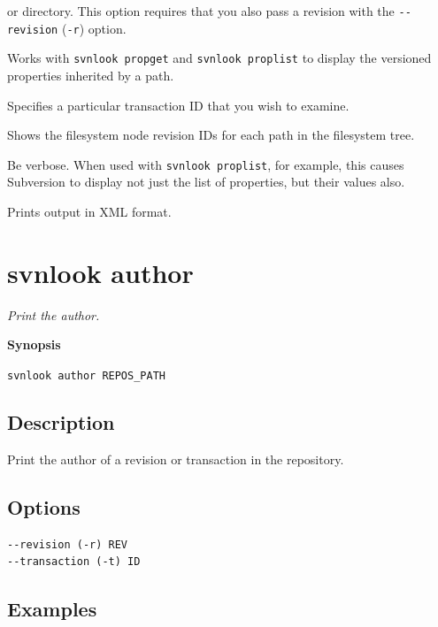 \begin{description}
or directory. This option requires that you also pass a revision with
the \texttt{-\/-revision} (\texttt{-r}) option.
\item[\protect\phantomsection\label{svn.ref.svnlook.sw.show_inherited_props}{}\texttt{-\/-show-inherited-props}]
Works with \texttt{svnlook\ propget} and \texttt{svnlook\ proplist} to
display the versioned properties inherited by a path.
\item[\protect\phantomsection\label{svn.ref.svnlook.sw.transaction}{}\texttt{-\/-transaction}
(\texttt{-t}) \textless ID\textgreater{}]
Specifies a particular transaction ID that you wish to examine.
\item[\protect\phantomsection\label{svn.ref.svnlook.sw.show_ids}{}\texttt{-\/-show-ids}]
Shows the filesystem node revision IDs for each path in the filesystem
tree.
\item[\protect\phantomsection\label{svn.ref.svnlook.sw.verbose}{}\texttt{-\/-verbose}
(\texttt{-v})]
Be verbose. When used with \texttt{svnlook\ proplist}, for example, this
causes Subversion to display not just the list of properties, but their
values also.
\item[\protect\phantomsection\label{svn.ref.svnlook.sw.xml}{}\texttt{-\/-xml}]
Prints output in XML format.
\end{description}

\section{svnlook author}\label{svn.ref.svnlook.c.author}

\emph{Print the author.}

\textbf{Synopsis}

\texttt{svnlook\ author\ REPOS\_PATH}

\subsection{Description}

Print the author of a revision or transaction in the repository.

\subsection{Options}

\begin{verbatim}
--revision (-r) REV
--transaction (-t) ID
\end{verbatim}

\subsection{Examples}

